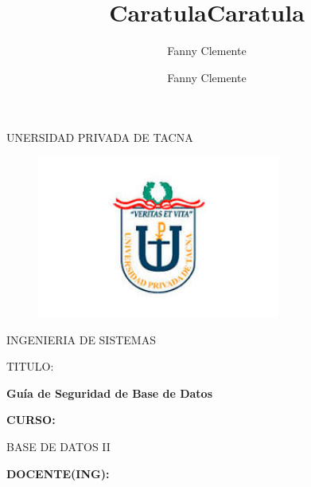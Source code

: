 \documentclass[12pt,letterpaper]{article}
\author{Fanny Clemente}
\title{Caratula}
\begin{document}
\author{Fanny Clemente}
\title{Caratula}

\begin{titlepage}
\begin{center}
\large{UNERSIDAD PRIVADA DE TACNA}\\
\vspace*{-0.025in}
\begin{figure}[htb]
\begin{center}
\includegraphics[width=8cm]{./IMG/logo}
\end{center}
\end{figure}
\vspace*{0.15in}
INGENIERIA DE SISTEMAS  \\

\vspace*{0.5in}
\begin{large}
TITULO:\\
\end{large}

\vspace*{0.1in}
\begin{Large}
\textbf{Guía de Seguridad de Base de Datos} \\
\end{Large}

\vspace*{0.3in}
\begin{Large}
\textbf{CURSO:} \\
\end{Large}

\vspace*{0.1in}
\begin{large}
BASE DE DATOS II\\
\end{large}

\vspace*{0.3in}
\begin{Large}
\textbf{DOCENTE(ING):} \\
\end{Large}


\end{center}
\end{titlepage}
\end{document}
